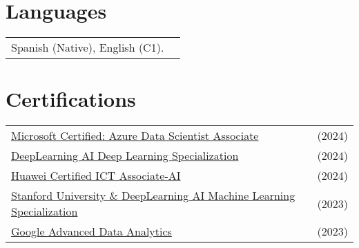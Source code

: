 \documentclass[a4paper,10pt]{article}
\begin{document}
\section{Languages}
\begin{tabularx}{\linewidth}{@{}l X@{}}
Spanish (Native), English (C1).\\  
\end{tabularx}

\section{Certifications}
\begin{tabularx}{\linewidth}{@{}l X@{}}	
\href{https://balcortex.github.io/assets/certifications/microsoft_azure_data_scientist_associate.pdf}{Microsoft Certified: Azure Data Scientist Associate} & \hfill (2024) \\
\href{https://balcortex.github.io/assets/certifications/coursera_deep_learning.pdf}{DeepLearning AI Deep Learning Specialization} & \hfill (2024) \\
\href{https://balcortex.github.io/assets/certifications/huawei_certification.pdf}{Huawei Certified ICT Associate-AI} & \hfill (2024) \\
\href{https://balcortex.github.io/assets/certifications/coursera_machine_learning.pdf}{Stanford University \& DeepLearning AI Machine Learning Specialization} & \hfill (2023) \\
\href{https://balcortex.github.io/assets/certifications/coursera_google_advanced_data_analytics.pdf}{Google Advanced Data Analytics} & \hfill (2023) \\
\end{tabularx}

\end{document}
